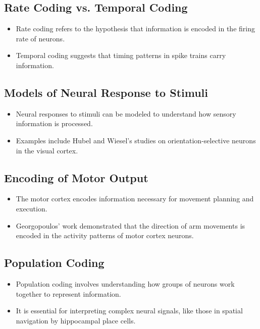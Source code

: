 \documentclass{article}
\begin{document}
\subsection{Rate Coding vs. Temporal Coding}
\begin{itemize}
    \item Rate coding refers to the hypothesis that information is encoded in the firing rate of neurons.
    \item Temporal coding suggests that timing patterns in spike trains carry information.
\end{itemize}

\subsection{Models of Neural Response to Stimuli}
\begin{itemize}
    \item Neural responses to stimuli can be modeled to understand how sensory information is processed.
    \item Examples include Hubel and Wiesel's studies on orientation-selective neurons in the visual cortex.
\end{itemize}

\subsection{Encoding of Motor Output}
\begin{itemize}
    \item The motor cortex encodes information necessary for movement planning and execution.
    \item Georgopoulos' work demonstrated that the direction of arm movements is encoded in the activity patterns of motor cortex neurons.
\end{itemize}

\subsection{Population Coding}
\begin{itemize}
    \item Population coding involves understanding how groups of neurons work together to represent information.
    \item It is essential for interpreting complex neural signals, like those in spatial navigation by hippocampal place cells.
\end{itemize}
\end{document}
